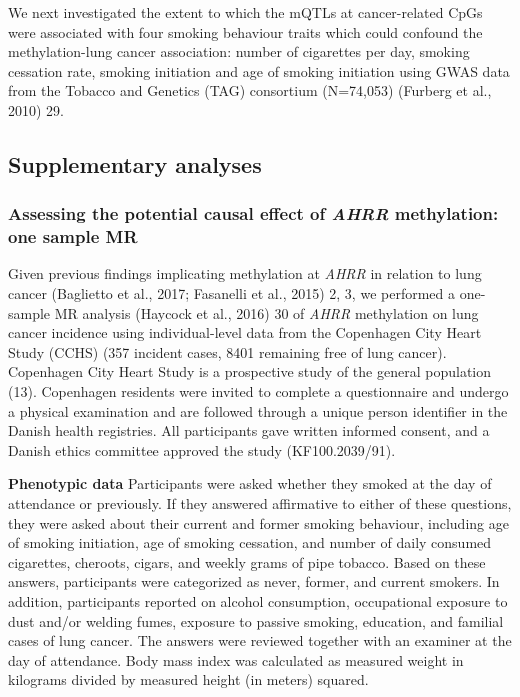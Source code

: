 \documentclass[11pt,twoside]{bristolthesis}
\begin{document}
We next investigated the extent to which the mQTLs at cancer-related CpGs were associated with four smoking behaviour traits which could confound the methylation-lung cancer association: number of cigarettes per day, smoking cessation rate, smoking initiation and age of smoking initiation using GWAS data from the Tobacco and Genetics (TAG) consortium (N=74,053) (Furberg et al., 2010) 29.

\hypertarget{supplementary-analyses}{%
\subsection{Supplementary analyses}\label{supplementary-analyses}}

\hypertarget{assessing-the-potential-causal-effect-of-ahrr-methylation-one-sample-mr}{%
\subsubsection{\texorpdfstring{Assessing the potential causal effect of \emph{AHRR} methylation: one sample MR}{Assessing the potential causal effect of AHRR methylation: one sample MR}}\label{assessing-the-potential-causal-effect-of-ahrr-methylation-one-sample-mr}}

Given previous findings implicating methylation at \emph{AHRR} in relation to lung cancer (Baglietto et al., 2017; Fasanelli et al., 2015) 2, 3, we performed a one-sample MR analysis (Haycock et al., 2016) 30 of \emph{AHRR} methylation on lung cancer incidence using individual-level data from the Copenhagen City Heart Study (CCHS) (357 incident cases, 8401 remaining free of lung cancer). Copenhagen City Heart Study is a prospective study of the general population (13). Copenhagen residents were invited to complete a questionnaire and undergo a physical examination and are followed through a unique person identifier in the Danish health registries. All participants gave written informed consent, and a Danish ethics committee approved the study (KF100.2039/91).

\textbf{Phenotypic data}
Participants were asked whether they smoked at the day of attendance or previously. If they answered affirmative to either of these questions, they were asked about their current and former smoking behaviour, including age of smoking initiation, age of smoking cessation, and number of daily consumed cigarettes, cheroots, cigars, and weekly grams of pipe tobacco. Based on these answers, participants were categorized as never, former, and current smokers. In addition, participants reported on alcohol consumption, occupational exposure to dust and/or welding fumes, exposure to passive smoking, education, and familial cases of lung cancer. The answers were reviewed together with an examiner at the day of attendance. Body mass index was calculated as measured weight in kilograms divided by measured height (in meters) squared.
\end{document}
